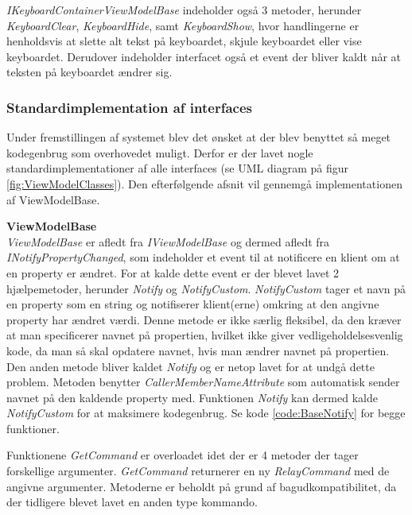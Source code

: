 \textit{IKeyboardContainerViewModelBase} indeholder også 3 metoder, herunder \textit{KeyboardClear}, \textit{KeyboardHide}, samt \textit{KeyboardShow}, hvor handlingerne er henholdsvis at slette alt tekst på keyboardet, skjule keyboardet eller vise keyboardet. Derudover indeholder interfacet også et event der bliver kaldt når at teksten på keyboardet ændrer sig.

\subsubsection*{Standardimplementation af interfaces}
Under fremstillingen af systemet blev det ønsket at der blev benyttet så meget kodegenbrug som overhovedet muligt. Derfor er der lavet nogle standardimplementationer af alle interfaces (se UML diagram på figur \ref{fig:ViewModelClasses}). Den efterfølgende afsnit vil gennemgå implementationen af ViewModelBase.


\textbf{ViewModelBase}\\
\textit{ViewModelBase} er afledt fra \textit{IViewModelBase} og dermed afledt fra \textit{INotifyPropertyChanged}, som indeholder et event til at notificere en klient om at en property er ændret. For at kalde dette event er der blevet lavet 2 hjælpemetoder, herunder \textit{Notify} og \textit{NotifyCustom}. \textit{NotifyCustom} tager et navn på en property som en string og notifiserer klient(erne) omkring at den angivne property har ændret værdi. Denne metode er ikke særlig fleksibel, da den kræver at man specificerer navnet på propertien, hvilket ikke giver vedligeholdelsesvenlig kode, da man så skal opdatere navnet, hvis man ændrer navnet på propertien.\\

Den anden metode bliver kaldet \textit{Notify} og er netop lavet for at undgå dette problem. Metoden benytter \textit{CallerMemberNameAttribute} som automatisk sender navnet på den kaldende property med. Funktionen \textit{Notify} kan dermed kalde \textit{NotifyCustom} for at maksimere kodegenbrug. Se kode \ref{code:BaseNotify} for begge funktioner.


Funktionene \textit{GetCommand} er overloadet idet der er 4 metoder der tager forskellige argumenter. \textit{GetCommand} returnerer en ny \textit{RelayCommand} med de angivne argumenter. Metoderne er beholdt på grund af bagudkompatibilitet, da der tidligere blevet lavet en anden type kommando.

